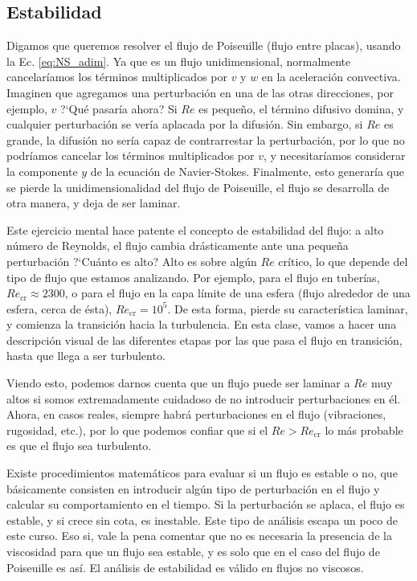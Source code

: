 \subsection*{Estabilidad}
Digamos que queremos resolver el flujo de Poiseuille (flujo entre placas), usando la Ec. \eqref{eq:NS_adim}.
Ya que es un flujo unidimensional, normalmente cancelaríamos los términos multiplicados por $v$ y $w$ en la aceleración convectiva.
Imaginen que agregamos una perturbación en una de las otras direcciones, por ejemplo, $v$ \mbox{?`}Qué pasaría ahora?
Si $Re$ es pequeño, el término difusivo domina, y cualquier perturbación se vería aplacada por la difusión.
Sin embargo, si $Re$ es grande, la difusión no sería capaz de contrarrestar la perturbación, por lo que no podríamos cancelar los términos multiplicados por $v$, y necesitaríamos considerar la componente $y$ de la ecuación de Navier-Stokes.
Finalmente, esto generaría que se pierde la unidimensionalidad del flujo de Poiseuille, el flujo se desarrolla de otra manera, y deja de ser laminar.

Este ejercicio mental hace patente el concepto de estabilidad del flujo: a alto número de Reynolds, el flujo cambia drásticamente ante una pequeña perturbación
\mbox{?`}Cuánto es alto? Alto es sobre algún $Re$ crítico, lo que depende del tipo de flujo que estamos analizando.
Por ejemplo, para el flujo en tuberías, $Re_\text{cr}\approx2300$, o para el flujo en la capa límite de una esfera (flujo alrededor de una esfera, cerca de ésta), $Re_\text{cr}=10^5$.
De esta forma, pierde su característica laminar, y comienza la transición hacia la turbulencia.
En esta clase, vamos a hacer una descripción visual de las diferentes etapas por las que pasa el flujo en transición, hasta que llega a ser turbulento.

Viendo esto, podemos darnos cuenta que un flujo puede ser laminar a $Re$ muy altos si somos extremadamente cuidadoso de no introducir perturbaciones en él.
Ahora, en casos reales, siempre habrá perturbaciones en el flujo (vibraciones, rugosidad, etc.), por lo que podemos confiar que si el $Re>Re_\text{cr}$ lo más probable es que el flujo sea turbulento.

Existe procedimientos matemáticos para evaluar si un flujo es estable o no, que básicamente consisten en introducir algún tipo de perturbación en el flujo y calcular su comportamiento en el tiempo. 
Si la perturbación se aplaca, el flujo es estable, y si crece sin cota, es inestable.
Este tipo de análisis escapa un poco de este curso.
Eso si, vale la pena comentar que no es necesaria la presencia de la viscosidad para que un flujo sea estable, y es solo que en el caso del flujo de Poiseuille es así. 
El análisis de estabilidad es válido en flujos no viscosos.

